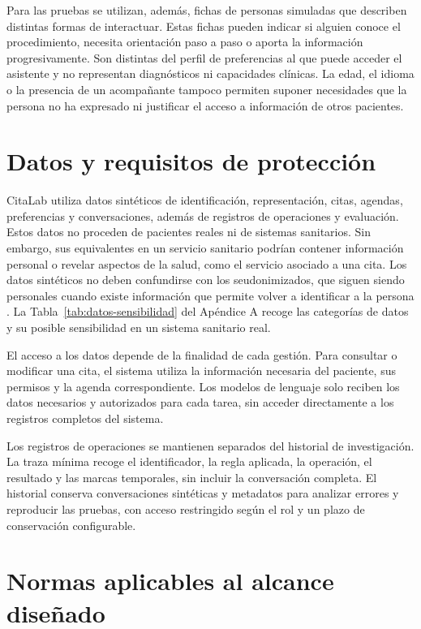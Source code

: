 Para las pruebas se utilizan, además, fichas de personas simuladas que describen distintas formas de interactuar. Estas fichas pueden indicar si alguien conoce el procedimiento, necesita orientación paso a paso o aporta la información progresivamente. Son distintas del perfil de preferencias al que puede acceder el asistente y no representan diagnósticos ni capacidades clínicas. La edad, el idioma o la presencia de un acompañante tampoco permiten suponer necesidades que la persona no ha expresado ni justificar el acceso a información de otros pacientes.

\section{Datos y requisitos de protección}

CitaLab utiliza datos sintéticos de identificación, representación, citas, agendas, preferencias y conversaciones, además de registros de operaciones y evaluación. Estos datos no proceden de pacientes reales ni de sistemas sanitarios. Sin embargo, sus equivalentes en un servicio sanitario podrían contener información personal o revelar aspectos de la salud, como el servicio asociado a una cita. Los datos sintéticos no deben confundirse con los seudonimizados, que siguen siendo personales cuando existe información que permite volver a identificar a la persona \citep{eu2016gdpr}. La Tabla~\ref{tab:datos-sensibilidad} del Apéndice A recoge las categorías de datos y su posible sensibilidad en un sistema sanitario real.

El acceso a los datos depende de la finalidad de cada gestión. Para consultar o modificar una cita, el sistema utiliza la información necesaria del paciente, sus permisos y la agenda correspondiente. Los modelos de lenguaje solo reciben los datos necesarios y autorizados para cada tarea, sin acceder directamente a los registros completos del sistema.

Los registros de operaciones se mantienen separados del historial de investigación. La traza mínima recoge el identificador, la regla aplicada, la operación, el resultado y las marcas temporales, sin incluir la conversación completa. El historial conserva conversaciones sintéticas y metadatos para analizar errores y reproducir las pruebas, con acceso restringido según el rol y un plazo de conservación configurable.

\section{Normas aplicables al alcance diseñado}
\label{sec:normas-aplicables}

